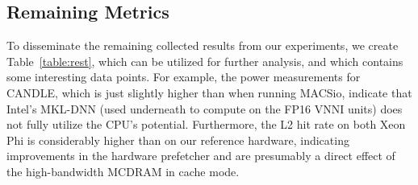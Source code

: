 \subsection{Remaining Metrics}\label{ssec:eval_rest}
%
To disseminate the remaining collected results from our experiments, we create Table~\ref{table:rest}, which can be utilized for further
analysis, and which contains some interesting data points. For example, the power measurements for CANDLE, which is just slightly
higher than when running MACSio, indicate that Intel's MKL-DNN (used underneath to compute on the FP16 VNNI units) does not
fully utilize the CPU's potential. Furthermore, the L2 hit rate on both Xeon Phi is considerably higher than on our reference
hardware, indicating improvements in the hardware prefetcher and are presumably a direct effect of the high-bandwidth MCDRAM in cache mode.
%
